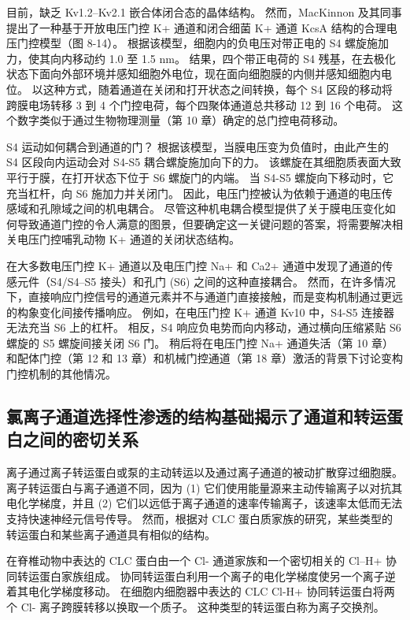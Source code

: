目前，缺乏 Kv1.2–Kv2.1 嵌合体闭合态的晶体结构。 然而，MacKinnon 及其同事提出了一种基于开放电压门控 K+ 通道和闭合细菌 K+ 通道 KcsA 结构的合理电压门控模型（图 8-14）。 根据该模型，细胞内的负电压对带正电的 S4 螺旋施加力，使其向内移动约 1.0 至 1.5 nm。 结果，四个带正电荷的 S4 残基，在去极化状态下面向外部环境并感知细胞外电位，现在面向细胞膜的内侧并感知细胞内电位。 以这种方式，随着通道在关闭和打开状态之间转换，每个 S4 区段的移动将跨膜电场转移 3 到 4 个门控电荷，每个四聚体通道总共移动 12 到 16 个电荷。 这个数字类似于通过生物物理测量（第 10 章）确定的总门控电荷移动。

S4 运动如何耦合到通道的门？ 根据该模型，当膜电压变为负值时，由此产生的 S4 区段向内运动会对 S4-S5 耦合螺旋施加向下的力。 该螺旋在其细胞质表面大致平行于膜，在打开状态下位于 S6 螺旋门的内端。 当 S4-S5 螺旋向下移动时，它充当杠杆，向 S6 施加力并关闭门。 因此，电压门控被认为依赖于通道的电压传感域和孔隙域之间的机电耦合。 尽管这种机电耦合模型提供了关于膜电压变化如何导致通道门控的令人满意的图景，但要确定这一关键问题的答案，将需要解决相关电压门控哺乳动物 K+ 通道的关闭状态结构。

在大多数电压门控 K+ 通道以及电压门控 Na+ 和 Ca2+ 通道中发现了通道的传感元件（S4/S4–S5 接头）和孔门 (S6) 之间的这种直接耦合。 然而，在许多情况下，直接响应门控信号的通道元素并不与通道门直接接触，而是变构机制通过更远的构象变化间接传播响应。 例如，在电压门控 K+ 通道 Kv10 中，S4-S5 连接器无法充当 S6 上的杠杆。 相反，S4 响应负电势而向内移动，通过横向压缩紧贴 S6 螺旋的 S5 螺旋间接关闭 S6 门。 稍后将在电压门控 Na+ 通道失活（第 10 章）和配体门控（第 12 和 13 章）和机械门控通道（第 18 章）激活的背景下讨论变构门控机制的其他情况。

\subsection{氯离子通道选择性渗透的结构基础揭示了通道和转运蛋白之间的密切关系}
离子通过离子转运蛋白或泵的主动转运以及通过离子通道的被动扩散穿过细胞膜。 离子转运蛋白与离子通道不同，因为 (1) 它们使用能量源来主动传输离子以对抗其电化学梯度，并且 (2) 它们以远低于离子通道的速率传输离子，该速率太低而无法支持快速神经元信号传导。 然而，根据对 CLC 蛋白质家族的研究，某些类型的转运蛋白和某些离子通道具有相似的结构。

在脊椎动物中表达的 CLC 蛋白由一个 Cl- 通道家族和一个密切相关的 Cl--H+ 协同转运蛋白家族组成。 协同转运蛋白利用一个离子的电化学梯度使另一个离子逆着其电化学梯度移动。 在细胞内细胞器中表达的 CLC Cl-H+ 协同转运蛋白将两个 Cl- 离子跨膜转移以换取一个质子。 这种类型的转运蛋白称为离子交换剂。

